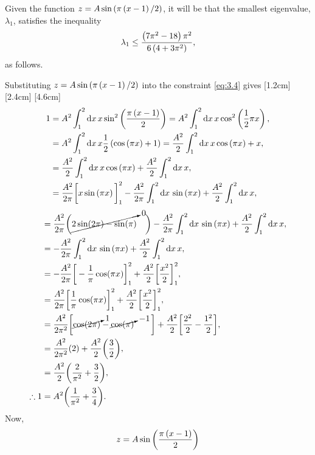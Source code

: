 Given the function $z=A\sin\left(\pi\left(x-1\right)/2\right)$, it will be that the smallest eigenvalue, $\lambda_1$, satisfies the inequality
\[
	\lambda_1\leq \frac{\left(7\pi^2-18\right)\pi^2}{6\left(4+3\pi^2\right)},
\]
as follows.

Substituting $z=A\sin\left(\pi\left(x-1\right)/2\right)$ into the constraint \eqref{eq:3.4} gives
[1.2cm]
[2.4cm]
[4.6cm]
\begin{align*}
	1 &= A^2\int_{1}^{2}\mathrm{d} x\, x \sin^2\left(\frac{\pi\left(x-1\right)}{2}\right)
	= A^2\int_{1}^{2}\mathrm{d} x\, x\cos^2\left(\frac{1}{2}\pi x\right),\nonumber\\
	&= A^2\int_{1}^{2}\mathrm{d} x\, x \frac{1}{2}\left(\cos\left(\pi x\right) + 1\right) = \frac{A^2}{2}\int_{1}^{2}\mathrm{d} x\, x\cos\left(\pi x\right) + x,\nonumber\\
	&= \frac{A^2}{2}\int_{1}^{2}\mathrm{d} x\, x\cos\left(\pi x\right) + \frac{A^2}{2}\int_{1}^{2}\mathrm{d} x\, x,\nonumber\\
	&= \frac{A^2}{2\pi}\bigg[x\sin\left(\pi x\right)\bigg]_1^2 - \frac{A^2}{2\pi}\int_{1}^{2}\mathrm{d} x\,\sin\left(\pi x\right) + \frac{A^2}{2}\int_{1}^{2}\mathrm{d} x\, x,\nonumber\\
\end{align*}
\begin{align}
	&=\frac{A^2}{2\pi}\bigg(\cancelto{0}{2\sin(2\pi) - \sin(\pi)}\quad\bigg)- \frac{A^2}{2\pi}\int_{1}^{2}\mathrm{d} x\,\sin\left(\pi x\right) + \frac{A^2}{2}\int_{1}^{2}\mathrm{d} x\, x,\nonumber\\
	&=-\frac{A^2}{2\pi}\int_{1}^{2}\mathrm{d} x\,\sin\left(\pi x\right) + \frac{A^2}{2}\int_{1}^{2}\mathrm{d} x\, x,\nonumber\\
	&=-\frac{A^2}{2\pi}\bigg[-\frac{1}{\pi}\cos(\pi x)\bigg]_1^2 + \frac{A^2}{2}\bigg[\frac{x^2}{2}\bigg]_1^2,\nonumber\\
	&= \frac{A^2}{2\pi}\bigg[\frac{1}{\pi}\cos(\pi x)\bigg]_1^2 + \frac{A^2}{2}\bigg[\frac{x^2}{2}\bigg]_1^2,\nonumber\\
	&= \frac{A^2}{2\pi^2}\bigg[\cancelto{1}{\cos(2\pi)}-\cancelto{-1}{\cos(\pi)}\quad\quad\bigg] + \frac{A^2}{2}\bigg[\frac{2^2}{2}-\frac{1^2}{2}\bigg],\nonumber\\
	&= \frac{A^2}{2\pi^2}(2)+ \frac{A^2}{2}\bigg(\frac{3}{2}\bigg),\nonumber\\
	&= \frac{A^2}{2}\bigg(\frac{2}{\pi^2}+\frac{3}{2}\bigg),\nonumber\\
		\label{eq:3.6}
	\therefore 1&= A^2\bigg(\frac{1}{\pi^2}+\frac{3}{4}\bigg).
\end{align}
Now,
\[
	z=A\sin\left(\frac{\pi\left(x-1\right)}{2}\right)
\]

